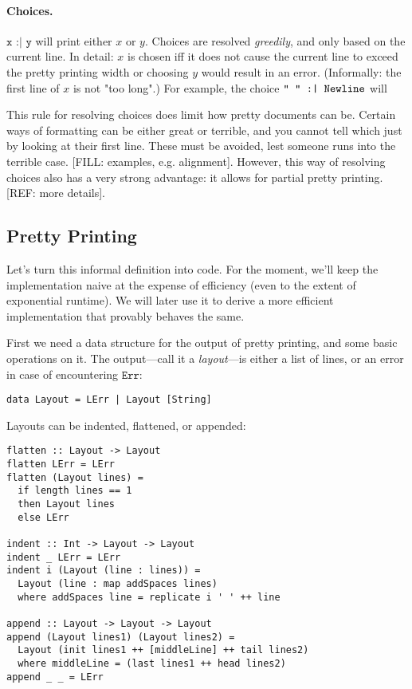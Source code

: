 \documentclass{article}
\newcommand{\choice}[2]{\texttt{#1 :| #2}}
\newcommand{\err}{\texttt{Err}}
\newcommand{\nl}{\texttt{Newline}}
\begin{document}
\paragraph{Choices.} $\choice{x}{y}$ will print either $x$ or $y$. Choices are resolved
\emph{greedily}, and only based on the current line. In detail: $x$ is chosen iff it does not cause
the current line to exceed the pretty printing width or choosing $y$ would result in an error.
(Informally: the first line of $x$ is not "too long".) For example, the choice $\choice{\text{"
"}}{\nl}$ will 

This rule for resolving choices does limit how pretty documents can be. Certain ways of formatting
can be either great or terrible, and you cannot tell which just by looking at their first line.
These must be avoided, lest someone runs into the terrible case. [FILL: examples, e.g. alignment]. 
However, this way of resolving choices also has a very strong advantage: it allows for partial
pretty printing. [REF: more details].

\subsection{Pretty Printing}

Let's turn this informal definition into code. For the moment, we'll keep the implementation naive
at the expense of efficiency (even to the extent of exponential runtime). We will later use it to
derive a more efficient implementation that provably behaves the same.

First we need a data structure for the output of pretty printing, and some basic operations on it.
The output---call it a \emph{layout}---is either a list of lines, or an error in case of
encountering $\err$:

\begin{lstlisting}
data Layout = LErr | Layout [String]
\end{lstlisting}

Layouts can be indented, flattened, or appended:

\begin{lstlisting}
flatten :: Layout -> Layout
flatten LErr = LErr
flatten (Layout lines) =
  if length lines == 1
  then Layout lines
  else LErr

indent :: Int -> Layout -> Layout
indent _ LErr = LErr
indent i (Layout (line : lines)) =
  Layout (line : map addSpaces lines)
  where addSpaces line = replicate i ' ' ++ line

append :: Layout -> Layout -> Layout
append (Layout lines1) (Layout lines2) =
  Layout (init lines1 ++ [middleLine] ++ tail lines2)
  where middleLine = (last lines1 ++ head lines2)
append _ _ = LErr
\end{lstlisting}
\end{document}
